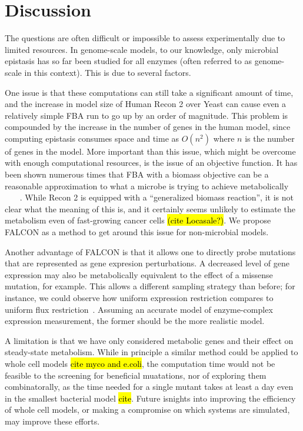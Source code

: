 \section{Discussion}

The questions are often
difficult or impossible to assess experimentally due to limited
resources.  In genome-scale models, to our knowledge, only microbial
epistasis has so far been studied for all enzymes (often referred to
as genome-scale in this context). This is due to several factors.

One issue is that these computations can still take a significant
amount of time, and the increase in model size of Human Recon 2 over
Yeast can cause even a relatively simple FBA run to go up by an order
of magnitude.  This problem is compounded by the increase in the
number of genes in the human model, since computing epistasis consumes
space and time as $O(n^2)$ where $n$ is the number of genes in the
model. More important than this issue, which might be overcome with
enough computational resources, is the issue of an objective
function. It has been shown numerous times that FBA with a biomass
objective can be a reasonable approximation to what a microbe is
trying to achieve metabolically
~\cite{Schuetz2012}~\cite{Fong2004}~\cite{Varma1994} . While Recon 2
is equipped with a ``generalized biomass reaction'', it is not clear
what the meaning of this is, and it certainly seems unlikely to
estimate the metabolism even of fast-growing cancer cells \hl{(cite
  Locasale?)}. We propose FALCON as a method to get around this issue
for non-microbial models.

Another advantage of FALCON is that it allows one to directly probe
mutations that are represented as gene expresion perturbations. A
decreased level of gene expression may also be metabolically
equivalent to the effect of a missense mutation, for example. This
allows a different sampling strategy than before; for instance, we
could observe how uniform expression restriction compares to uniform
flux restriction~\cite{Xu2012}. Assuming an accurate model of
enzyme-complex expression measurement, the former should be the more
realistic model.

A limitation is that we have only considered metabolic genes and their
effect on steady-state metabolism. While in principle a similar method
could be applied to whole cell models \hl{cite myco and e.coli}, the
computation time would not be feasible to the screening for beneficial
muatations, nor of exploring them combinatorally, as the time needed
for a single mutant takes at least a day even in the smallest
bacterial model \hl{cite}. Future isnights into improving the
efficiency of whole cell models, or making a compromise on which
systems are simulated, may improve these efforts.

